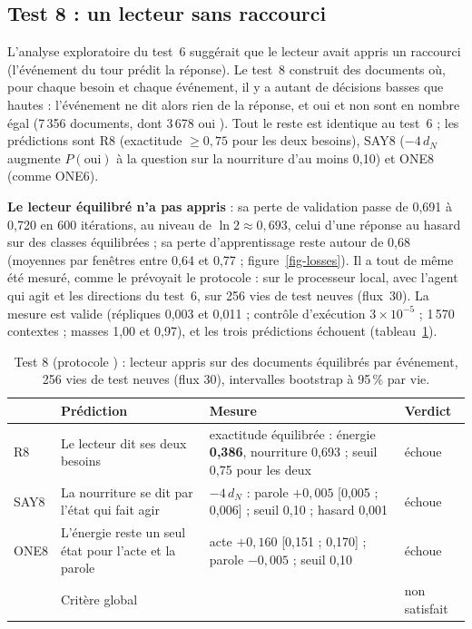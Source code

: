 \documentclass[11pt,a4paper]{article}
\newcommand{\dN}{d_{N}}
\newcommand{\code}[1]{\texttt{\detokenize{#1}}}
\begin{document}
\subsection{Test 8 : un lecteur sans raccourci}
\label{sec-t8}

L'analyse exploratoire du test~6 suggérait que le lecteur avait appris un
raccourci (l'événement du tour prédit la réponse). Le test~8 construit des
documents où, pour chaque besoin et chaque événement, il y a autant de décisions
basses que hautes : l'événement ne dit alors rien de la réponse, et \og oui \fg{}
et \og non \fg{} sont en nombre égal (7\,356 documents, dont 3\,678 \og oui \fg{}).
Tout le reste est identique au test~6 ; les prédictions sont R8 (exactitude
$\ge0,75$ pour les deux besoins), SAY8 ($-4\,\dN$ augmente $P(\text{oui})$ à la
question sur la nourriture d'au moins 0,10) et ONE8 (comme ONE6).

\textbf{Le lecteur équilibré n'a pas appris} : sa perte de validation passe de 0,691
à 0,720 en 600 itérations, au niveau de $\ln 2\approx0,693$, celui d'une réponse au
hasard sur des classes équilibrées ; sa perte d'apprentissage reste autour de 0,68
(moyennes par fenêtres entre 0,64 et 0,77 ; figure~\ref{fig-losses}). Il a tout de
même été mesuré, comme le prévoyait le protocole : sur le processeur local, avec
l'agent qui agit et les directions du test~6, sur 256 vies de test neuves (flux~30).
La mesure est valide (répliques 0,003 et 0,011 ; contrôle d'exécution
$3\times10^{-5}$ ; 1\,570 contextes ; masses 1,00 et 0,97), et les trois prédictions
échouent (tableau~\ref{tab-t8}).

\begin{table}[t]
\centering
\caption{Test 8 (protocole \code{c7b5624}) : lecteur appris sur des documents
équilibrés par événement, 256 vies de test neuves (flux 30), intervalles bootstrap à
95\,\% par vie.}
\label{tab-t8}
\small
\begin{tabularx}{\textwidth}{@{}l >{\raggedright\arraybackslash}p{3.6cm} X l@{}}
\toprule
& Prédiction & Mesure & Verdict \\
\midrule
R8 & Le lecteur dit ses deux besoins & exactitude équilibrée : énergie \textbf{0,386}, nourriture 0,693 ; seuil 0,75 pour les deux & échoue \\
SAY8 & La nourriture se dit par l'état qui fait agir & $-4\,\dN$ : parole $+0,005$ [0,005 ; 0,006] ; seuil 0,10 ; hasard 0,001 & échoue \\
ONE8 & L'énergie reste un seul état pour l'acte et la parole & acte $+0,160$ [0,151 ; 0,170] ; parole $-0,005$ ; seuil 0,10 & échoue \\
\midrule
& Critère global & & non satisfait \\
\bottomrule
\end{tabularx}
\end{table}
\end{document}
